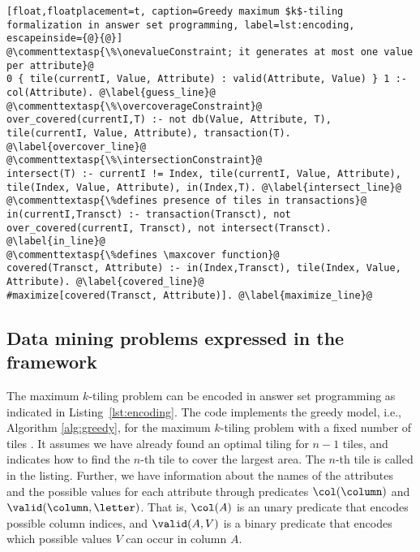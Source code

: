 \begin{lstlisting}[float,floatplacement=t, caption=Greedy maximum $k$-tiling formalization in answer set programming, label=lst:encoding, escapeinside={@}{@}] 
@\commenttextasp{\%\onevalueConstraint; it generates at most one value per attribute}@
0 { tile(currentI, Value, Attribute) : valid(Attribute, Value) } 1 :- col(Attribute). @\label{guess_line}@
@\commenttextasp{\%\overcoverageConstraint}@
over_covered(currentI,T) :- not db(Value, Attribute, T), tile(currentI, Value, Attribute), transaction(T). @\label{overcover_line}@
@\commenttextasp{\%\intersectionConstraint}@
intersect(T) :- currentI != Index, tile(currentI, Value, Attribute), tile(Index, Value, Attribute), in(Index,T). @\label{intersect_line}@
@\commenttextasp{\%defines presence of tiles in transactions}@
in(currentI,Transct) :- transaction(Transct), not over_covered(currentI, Transct), not intersect(Transct). @\label{in_line}@
@\commenttextasp{\%defines \maxcover function}@
covered(Transct, Attribute) :- in(Index,Transct), tile(Index, Value, Attribute). @\label{covered_line}@
#maximize[covered(Transct, Attribute)]. @\label{maximize_line}@
\end{lstlisting}

\subsection{Data mining problems expressed in the framework} 

The maximum $k$-tiling problem can be encoded in answer set programming as indicated in Listing~\ref{lst:encoding}. The code implements the greedy model, i.e., Algorithm \ref{alg:greedy}, for the maximum $k$-tiling problem with a fixed number of tiles \parencite{tiling}. It assumes we have already found an optimal tiling for $n-1$ tiles, and indicates how to find the $n$-th tile to cover the largest area. The $n$-th tile is called \guess in the listing. \changesb Further, we have information about the names of the attributes and the possible values for each attribute through predicates $\col(\column)$ and $\valid(\column, \letter)$. That is, $\col(A)$ is an unary predicate that encodes possible column indices, and $\valid(A,V)$ is a binary predicate that encodes which possible values $V$ can occur in column $A$. \changese

